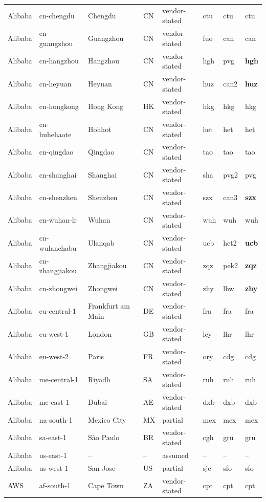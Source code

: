 \begin{longtable}{llllllll}
Alibaba & cn-chengdu & Chengdu & CN & vendor-stated & ctu & ctu & ctu \\
Alibaba & cn-guangzhou & Guangzhou & CN & vendor-stated & fuo & can & can \\
Alibaba & cn-hangzhou & Hangzhou & CN & vendor-stated & hgh & pvg & \textbf{hgh} \\
Alibaba & cn-heyuan & Heyuan & CN & vendor-stated & huz & can2 & \textbf{huz} \\
Alibaba & cn-hongkong & Hong Kong & HK & vendor-stated & hkg & hkg & hkg \\
Alibaba & cn-huhehaote & Hohhot & CN & vendor-stated & het & het & het \\
Alibaba & cn-qingdao & Qingdao & CN & vendor-stated & tao & tao & tao \\
Alibaba & cn-shanghai & Shanghai & CN & vendor-stated & sha & pvg2 & pvg \\
Alibaba & cn-shenzhen & Shenzhen & CN & vendor-stated & szx & can3 & \textbf{szx} \\
Alibaba & cn-wuhan-lr & Wuhan & CN & vendor-stated & wuh & wuh & wuh \\
Alibaba & cn-wulanchabu & Ulanqab & CN & vendor-stated & ucb & het2 & \textbf{ucb} \\
Alibaba & cn-zhangjiakou & Zhangjiakou & CN & vendor-stated & zqz & pek2 & \textbf{zqz} \\
Alibaba & cn-zhongwei & Zhongwei & CN & vendor-stated & zhy & lhw & \textbf{zhy} \\
Alibaba & eu-central-1 & Frankfurt am Main & DE & vendor-stated & fra & fra & fra \\
Alibaba & eu-west-1 & London & GB & vendor-stated & lcy & lhr & lhr \\
Alibaba & eu-west-2 & Paris & FR & vendor-stated & ory & cdg & cdg \\
Alibaba & me-central-1 & Riyadh & SA & vendor-stated & ruh & ruh & ruh \\
Alibaba & me-east-1 & Dubai & AE & vendor-stated & dxb & dxb & dxb \\
Alibaba & na-south-1 & Mexico City & MX & partial & mex & mex & mex \\
Alibaba & sa-east-1 & São Paulo & BR & vendor-stated & cgh & gru & gru \\
Alibaba & us-east-1 & -- & -- & assumed & -- & -- & -- \\
Alibaba & us-west-1 & San Jose & US & partial & sjc & sfo & sfo \\
AWS & af-south-1 & Cape Town & ZA & vendor-stated & cpt & cpt & cpt \\

\end{longtable}
